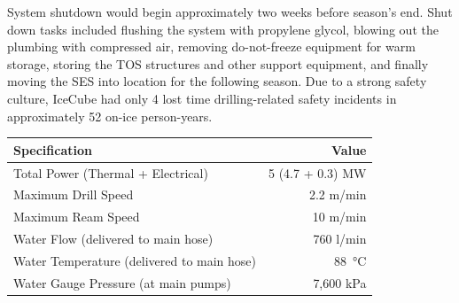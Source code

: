 System shutdown would begin approximately two weeks before season’s end.  Shut down tasks included flushing the system with propylene glycol, blowing out the plumbing with compressed air, removing do-not-freeze equipment for warm storage, storing the TOS structures and other support equipment, and finally moving the SES into location for the following season.
Due to a strong safety culture, IceCube had only 4 lost time drilling-related safety incidents in approximately 52 on-ice person-years.

\vspace{\baselineskip}

\begin{minipage}{\textwidth}
  \centering
{}
  \begin{tabular}{ l | r }
    \bf{Specification} & Value \\
    \hline	
    Total Power (Thermal + Electrical) & 5 (4.7 + 0.3) MW \\
    Maximum Drill Speed & 2.2 m/min \\   
    Maximum Ream Speed & 10 m/min \\
    Water Flow (delivered to main hose) & 760 l/min \\
    Water Temperature (delivered to main hose) & \SI{88}{\celsius} \\
    Water Gauge Pressure (at main pumps) & 7,600 kPa\\
  \end{tabular} 
  \label{tab:ehwd_system}
\end{minipage}
\vspace{\baselineskip}

